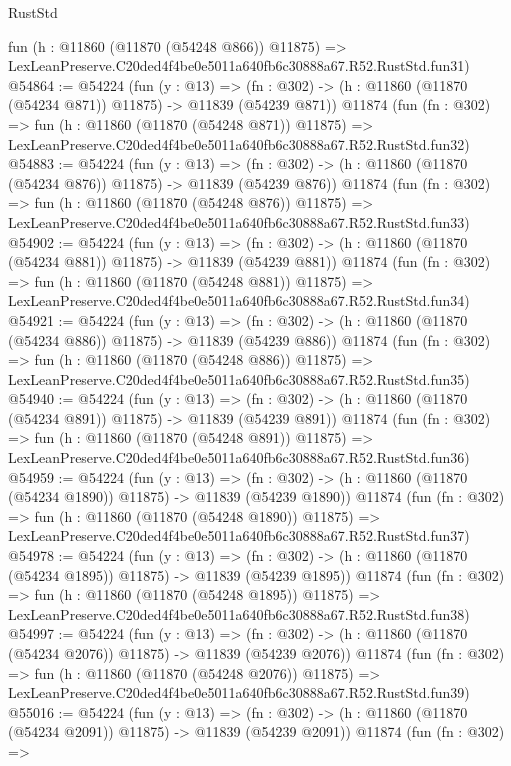 \begin{lexlean}{RustStd}
\begin{coremodule}
    fun (h : @11860 (@11870 (@54248 @866)) @11875) =>
    LexLeanPreserve.C20ded4f4be0e5011a640fb6c30888a67.R52.RustStd.fun31)
@54864 := @54224
    (fun (y : @13) =>
    (fn : @302) -> (h : @11860 (@11870 (@54234 @871)) @11875) -> @11839 (@54239 @871))
    @11874
    (fun (fn : @302) =>
    fun (h : @11860 (@11870 (@54248 @871)) @11875) =>
    LexLeanPreserve.C20ded4f4be0e5011a640fb6c30888a67.R52.RustStd.fun32)
@54883 := @54224
    (fun (y : @13) =>
    (fn : @302) -> (h : @11860 (@11870 (@54234 @876)) @11875) -> @11839 (@54239 @876))
    @11874
    (fun (fn : @302) =>
    fun (h : @11860 (@11870 (@54248 @876)) @11875) =>
    LexLeanPreserve.C20ded4f4be0e5011a640fb6c30888a67.R52.RustStd.fun33)
@54902 := @54224
    (fun (y : @13) =>
    (fn : @302) -> (h : @11860 (@11870 (@54234 @881)) @11875) -> @11839 (@54239 @881))
    @11874
    (fun (fn : @302) =>
    fun (h : @11860 (@11870 (@54248 @881)) @11875) =>
    LexLeanPreserve.C20ded4f4be0e5011a640fb6c30888a67.R52.RustStd.fun34)
@54921 := @54224
    (fun (y : @13) =>
    (fn : @302) -> (h : @11860 (@11870 (@54234 @886)) @11875) -> @11839 (@54239 @886))
    @11874
    (fun (fn : @302) =>
    fun (h : @11860 (@11870 (@54248 @886)) @11875) =>
    LexLeanPreserve.C20ded4f4be0e5011a640fb6c30888a67.R52.RustStd.fun35)
@54940 := @54224
    (fun (y : @13) =>
    (fn : @302) -> (h : @11860 (@11870 (@54234 @891)) @11875) -> @11839 (@54239 @891))
    @11874
    (fun (fn : @302) =>
    fun (h : @11860 (@11870 (@54248 @891)) @11875) =>
    LexLeanPreserve.C20ded4f4be0e5011a640fb6c30888a67.R52.RustStd.fun36)
@54959 := @54224
    (fun (y : @13) =>
    (fn : @302) -> (h : @11860 (@11870 (@54234 @1890)) @11875) -> @11839 (@54239 @1890))
    @11874
    (fun (fn : @302) =>
    fun (h : @11860 (@11870 (@54248 @1890)) @11875) =>
    LexLeanPreserve.C20ded4f4be0e5011a640fb6c30888a67.R52.RustStd.fun37)
@54978 := @54224
    (fun (y : @13) =>
    (fn : @302) -> (h : @11860 (@11870 (@54234 @1895)) @11875) -> @11839 (@54239 @1895))
    @11874
    (fun (fn : @302) =>
    fun (h : @11860 (@11870 (@54248 @1895)) @11875) =>
    LexLeanPreserve.C20ded4f4be0e5011a640fb6c30888a67.R52.RustStd.fun38)
@54997 := @54224
    (fun (y : @13) =>
    (fn : @302) -> (h : @11860 (@11870 (@54234 @2076)) @11875) -> @11839 (@54239 @2076))
    @11874
    (fun (fn : @302) =>
    fun (h : @11860 (@11870 (@54248 @2076)) @11875) =>
    LexLeanPreserve.C20ded4f4be0e5011a640fb6c30888a67.R52.RustStd.fun39)
@55016 := @54224
    (fun (y : @13) =>
    (fn : @302) -> (h : @11860 (@11870 (@54234 @2091)) @11875) -> @11839 (@54239 @2091))
    @11874
    (fun (fn : @302) =>

\end{coremodule}
\end{lexlean}
